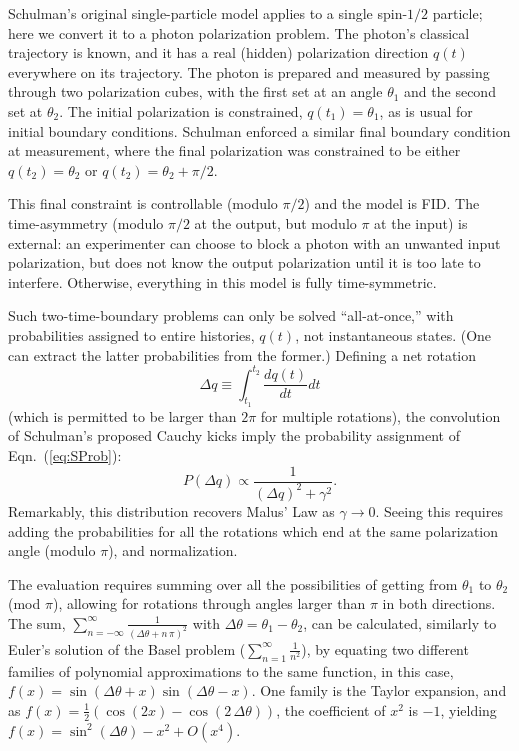 \documentclass[rmp, aps, preprint, longbibliography]{revtex4-1}
\begin{document}
Schulman's original single-particle model applies to a single spin-$1/2$ particle; here we convert it to a photon polarization problem.  The photon's classical trajectory is known, and it has a real (hidden) polarization direction $q(t)$ everywhere on its trajectory.  The photon is prepared and measured {by} passing through two polarization cubes, with the first set at an angle $\theta_1$ and the second set at $\theta_2$.  The initial polarization is constrained, $q(t_1)=\theta_1$, as is usual for initial boundary conditions.  Schulman enforced a similar final boundary condition at measurement, where the final polarization was constrained to be either $q(t_2)=\theta_2$ or $q(t_2)=\theta_2+\pi/2$.  

This final constraint is controllable (modulo $\pi/2$) and the model is FID.  The time-asymmetry (modulo $\pi/2$ at the output, but modulo $\pi$ at the input) is external: an experimenter can choose to block a photon with an unwanted input polarization, but does not know the output polarization until it is too late to interfere.  Otherwise, everything in this model is fully time-symmetric. 

Such two-time-boundary problems can only be solved ``all-at-once,'' with probabilities assigned to entire histories, $q(t)$, not instantaneous states.  (One can extract the latter probabilities from the former.)  Defining a net rotation 
\begin{equation}
\label{eq:Dl}
\Delta q\equiv\int^{t_2}_{t_1} \frac { d q(t)}{dt} dt
\end{equation}
(which is permitted to be larger than $2\pi$ for multiple rotations), the convolution of Schulman's proposed Cauchy kicks imply the probability assignment of Eqn.~(\ref{eq:SProb}):
\begin{equation}
\label{eq:SProbA}
P(\Delta q)\propto\frac{1}{(\Delta q)^2+\gamma^2}.
\end{equation}
Remarkably, this distribution recovers Malus' Law as $\gamma\to0$. Seeing this requires adding the probabilities for all the rotations which end at the same polarization angle (modulo $\pi$), and normalization.

The evaluation requires summing over all the possibilities of getting from $\theta_1$ to $\theta_2$(mod $\pi$), allowing for rotations through angles larger than $\pi$ in both directions.  The sum, 
$\sum _{n=-\infty }^{\infty } \frac{1}{( \Delta\theta + n\,\pi )^{2}}$
with $\Delta\theta = \theta_1 - \theta_2$,
can be calculated, similarly to Euler's solution of the Basel problem ($\sum _{n=1 }^{\infty } \frac{1}{n^{2}}$), by equating two different families of polynomial approximations to the same function, in this case, 
$f(x)=\sin(\Delta\theta+x) \sin(\Delta\theta-x)$.  
One family is the Taylor expansion, and as 
$f(x)=\frac{1}{2} \left( \cos(2x) - \cos(2 \, \Delta\theta) \right)$, the coefficient of $x^2$ is $-1$, yielding $f(x) = \sin^2(\Delta\theta) - x^2 +O(x^4)$.
\end{document}

